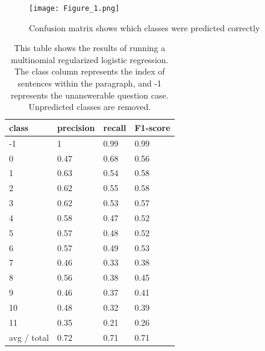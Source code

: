 \begin{figure}
  \texttt{[image: Figure\_1.png]}\centering
  \caption{Confusion matrix shows which classes were predicted correctly}
\end{figure}

\begin{table}
\centering
\caption{This table shows the results of running a multinomial regularized logistic regression. The class column represents the index of sentences within the paragraph, and -1 represents the unanswerable question case. Unpredicted classes are removed.}
\label{mlr-stage1}
\begin{tabular}{|l|l|l|l|} 
\hline
 \textbf{class}  & \textbf{precision}  & \textbf{recall}  & \textbf{F1-score}   \\ 
\hline
-1               & 1                   & 0.99             & 0.99                \\ 
\hline
0                & 0.47                & 0.68             & 0.56                \\ 
\hline
1                & 0.63                & 0.54             & 0.58                \\ 
\hline
2                & 0.62                & 0.55             & 0.58                \\ 
\hline
3                & 0.62                & 0.53             & 0.57                \\ 
\hline
4                & 0.58                & 0.47             & 0.52                \\ 
\hline
5                & 0.57                & 0.48             & 0.52                \\ 
\hline
6                & 0.57                & 0.49             & 0.53                \\ 
\cline{1-3}
7                & 0.46                & 0.33             & 0.38                \\ 
\hline
8                & 0.56                & 0.38             & 0.45                \\ 
\hline
9                & 0.46                & 0.37             & 0.41                \\ 
\hline
10               & 0.48                & 0.32             & 0.39                \\ 
\hline
11               & 0.35                & 0.21             & 0.26                \\ 
\hline
avg / total      & 0.72                & 0.71             & 0.71                \\
\hline
\end{tabular}
\end{table}

